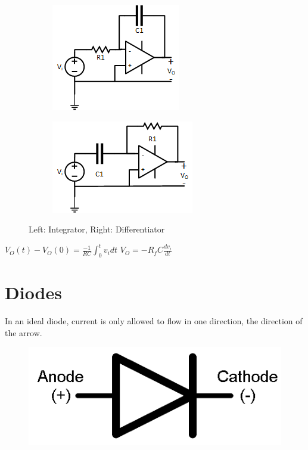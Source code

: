 \documentclass[10pt,letterpaper,final,twoside,notitlepage]{article}
\begin{document}
	\begin{figure}[ht]
		\begin{subfigure}
			\centering
			\includegraphics[scale=.7]{Integrator.png}
			\label{fig:Integrator}
		\end{subfigure}
		\hspace{25mm}
		\begin{subfigure}
			\centering
			\includegraphics[scale=.7]{Differentiator.png}
			\label{fig:Differentiator}
		\end{subfigure}
		\caption{Left: Integrator, Right: Differentiator}
	\end{figure}
	$V_{O}(t)-V_{O}(0)=\frac{-1}{RC}\int_{0}^{t} v_i dt$
	\hspace{30mm} $V_{O}=-R_f C \frac{dv_i}{dt}$
	
\section*{Diodes}
	In an ideal diode, current is only allowed to flow in one direction, the direction of the arrow. \newline
	
	\begin{figure}[!htbp]
		\centering
		\includegraphics[scale=.15]{Diode.png}
		\label{fig:Diode}
	\end{figure} 
	
\end{document}
